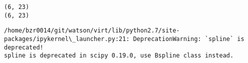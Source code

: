 \documentclass[11pt]{article}
\begin{document}
    \begin{Verbatim}[commandchars=\\\{\}]
(6, 23)
(6, 23)

    \end{Verbatim}

    \begin{Verbatim}[commandchars=\\\{\}]
/home/bzr0014/git/watson/virt/lib/python2.7/site-packages/ipykernel\_launcher.py:21: DeprecationWarning: `spline` is deprecated!
spline is deprecated in scipy 0.19.0, use Bspline class instead.

    \end{Verbatim}

    \begin{center}
    \end{center}
    { \hspace*{\fill} \\}
    
\end{document}
